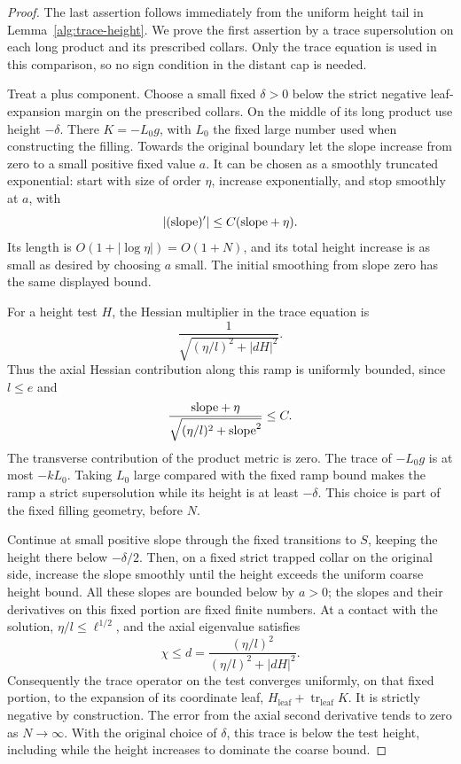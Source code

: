 \begin{proof}
The last assertion follows immediately from the uniform height tail
in Lemma~\ref{alg:trace-height}.  We prove the first assertion by a
trace supersolution on each long product and its prescribed collars.
Only the trace equation is used in this comparison, so no sign
condition in the distant cap is needed.

Treat a plus component.  Choose a small fixed \(\delta>0\) below the
strict negative leaf-expansion margin on the prescribed collars.
On the middle of its long product use height \(-\delta\).
There \(K=-L_0g\), with \(L_0\) the fixed large number used when
constructing the filling.  Towards the original boundary let the
slope increase from zero to a small positive fixed value \(a\).
It can be chosen as a smoothly truncated exponential: start with
size of order \(\eta\), increase exponentially, and stop smoothly
at \(a\), with
\[
 |(\hbox{slope})'|\le C(\hbox{slope}+\eta).
\]
Its length is \(O(1+|\log\eta|)=O(1+N)\), and its total height
increase is as small as desired by choosing \(a\) small.
The initial smoothing from slope zero has the same displayed bound.

For a height test \(H\), the Hessian multiplier in the trace equation
is
\[
 \frac{1}{\sqrt{(\eta/l)^2+|dH|^2}}.
\]
Thus the axial Hessian contribution along this ramp is uniformly
bounded, since \(l\le e\) and
\[
 \frac{\hbox{slope}+\eta}
      {\sqrt{(\eta/l)^2+\hbox{slope}^2}}\le C.
\]
The transverse contribution of the product metric is zero.
The trace of \(-L_0g\) is at most \(-kL_0\).  Taking \(L_0\)
large compared with the fixed ramp bound makes the ramp a strict
supersolution while its height is at least \(-\delta\).
This choice is part of the fixed filling geometry, before \(N\).

Continue at small positive slope through the fixed transitions to
\(S\), keeping the height there below \(-\delta/2\).
Then, on a fixed strict trapped collar on the original side,
increase the slope smoothly until the height exceeds the uniform
coarse height bound.  All these slopes are bounded below by \(a>0\);
the slopes and their derivatives on this fixed portion are fixed
finite numbers.  At a contact with the solution,
\(\eta/l\le\ell^{1/2}\), and the axial eigenvalue satisfies
\[
 \chi\le d
 =\frac{(\eta/l)^2}{(\eta/l)^2+|dH|^2}.
\]
Consequently the trace operator on the test converges uniformly,
on that fixed portion, to the expansion of its coordinate leaf,
\(H_{\mathrm{leaf}}+\operatorname{tr}_{\mathrm{leaf}}K\).
It is strictly negative by construction.  The error from the
axial second derivative tends to zero as \(N\to\infty\).
With the original choice of \(\delta\), this trace is below the
test height, including while the height increases to dominate the
coarse bound.


\end{proof}
